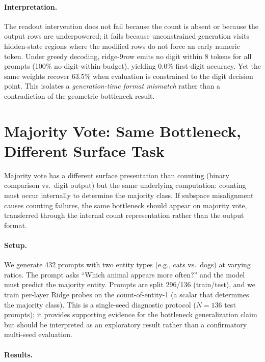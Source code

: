 \documentclass{article}
\begin{document}
\paragraph{Interpretation.}
The readout intervention does not fail because the count is absent or because the
output rows are underpowered; it fails because unconstrained generation visits
hidden-state regions where the modified rows do not force an early numeric token.
Under greedy decoding, ridge-9row emits no digit within 8 tokens for all prompts
(100\% no-digit-within-budget), yielding 0.0\% first-digit accuracy.
Yet the same weights recover 63.5\% when evaluation is constrained to the digit
decision point. This isolates a \emph{generation-time format mismatch} rather than
a contradiction of the geometric bottleneck result.

\section{Majority Vote: Same Bottleneck, Different Surface Task}
\label{sec:majority_vote}

Majority vote has a different surface presentation than counting (binary comparison vs.\ digit output)
but the same underlying computation: counting must occur internally to determine the majority class.
If subspace misalignment causes counting failures, the same bottleneck should appear on majority vote,
transferred through the internal count representation rather than the output format.

\paragraph{Setup.}
We generate 432 prompts with two entity types (e.g., cats vs.\ dogs) at varying ratios.
The prompt asks ``Which animal appears more often?'' and the model must predict the
majority entity.
Prompts are split 296/136 (train/test), and we train per-layer Ridge probes
on the count-of-entity-1 (a scalar that determines the majority class).
This is a single-seed diagnostic protocol ($N{=}136$ test prompts); it provides
supporting evidence for the bottleneck generalization claim but should be interpreted
as an exploratory result rather than a confirmatory multi-seed evaluation.

\paragraph{Results.}
\end{document}
